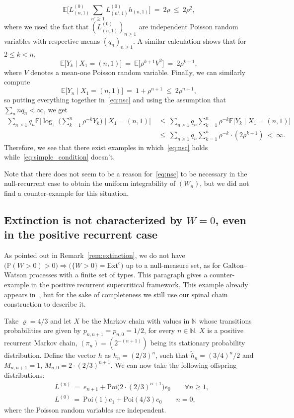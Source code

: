 \begin{refsegment}
\[    \mathbb{E}\Big[L^{(0)}_{(n,1)}\sum_{n'\geq 1}L^{(0)}_{(n',1)}
    h_{(n,1)} \Big]\ =\ 2 \rho\ \leq\ 2\rho^2,
  \]
  where we used the fact that $(L^{(0)}_{(n,1)})_{n\geq 1}$ are
  independent Poisson random variables with respective means
  $(q_n)_{n\geq 1}$. A similar calculation shows that for $2\leq k < n$,
\[
  \mathbb{E}\big[Y_k \mid X_1 = (n,1) \big]\ =\ \mathbb{E}\big[ \rho^{k+1}
  V^2 \big]\ =\ 2\rho^{k+1},
\]
where $V$ denotes a mean-one Poisson random variable. Finally, we can
similarly compute
\[
  \mathbb{E}\big[Y_n \mid X_1 = (n,1) \big]\ =\ 1+\rho^{n+1}\ \leq\ 2\rho^{n+1},
\]
so putting everything together in~\eqref{eq:nsc} and using the
assumption that $\sum_n nq_n<\infty$, we get
\begin{align*}
  \sum_{n\geq 1}q_n \mathbb{E}\Big[\log_+\Big( \sum_{k=1}^{n}\rho^{-k}
  Y_k \Big) \; \Big|\; X_1=(n,1) \Big]\
  & \leq\ \sum_{n\geq 1}q_n \sum_{k=1}^{n}\rho^{-k} \mathbb{E}\big[
    Y_k \; \big|\; X_1=(n,1) \big] \\
  &\leq\ \sum_{n\geq 1}q_n
    \sum_{k=1}^{n} \rho^{-k} \cdot (2 \rho^{k+1}) \ <\ \infty.
\end{align*}
Therefore, we see that there exist examples in
which~\eqref{eq:nsc} holds while~\eqref{eq:simple_condition} doesn't.

Note that there does not seem to be a reason for~\eqref{eq:nsc} to be necessary in the null-recurrent case to obtain the uniform integrability of $(W_n)$, but we did not find a counter-example for this situation.

\subsection*{Extinction is not characterized by $W=0$, even in the positive recurrent case}

As pointed out in Remark~\ref{rem:extinction}, we do not have $\big(\mathbb{P}(W>0)>0\big)\Rightarrow \big(\{W>0\}=\mathrm{Ext}^c\big)$ up to a null-measure set, as for Galton--Watson processes with a finite set of types.
This paragraph gives a counter-example in the positive recurrent supercritical framework.
This example already appears in~\citet[Section~4.1]{braunsteins_pathwise_2019}, but for the sake of completeness we still use our spinal chain construction to describe it.

Take $\varrho=4/3$ and let $X$ be the Markov chain with values in $\mathbb{N}$ whose transitions probabilities are given by $p_{n,n+1}=p_{n,0}=1/2$, for every $n\in \mathbb{N}$. $X$ is a positive recurrent Markov chain, $(\pi_n)=(2^{-(n+1)})$ being its stationary probability distribution.
Define the vector $h$ as $h_n=(2/3)^n$, such that $\tilde{h}_n=(3/4)^{n}/2$ and $M_{n,n+1}=1$, $M_{n,0}=2\cdot(2/3)^{n+1}$. We can now take the following offspring distributions:
\begin{align*}
 &L^{(n)}\ =\ e_{n+1} + \mathrm{Poi}\big(2\cdot (2/3)^{n+1}\big)e_0\qquad \forall n\geq 1, \\
 &L^{(0)}\ =\ \mathrm{Poi}(1)e_1 + \mathrm{Poi}(4/3)e_0\qquad n=0,
\end{align*} 
where the Poisson random variables are independent.


\end{refsegment}
